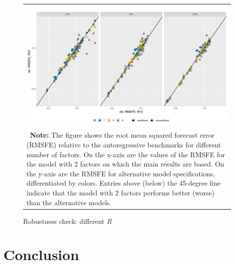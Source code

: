 \documentclass[notitlepage,a4paper,12pt]{article}
\begin{document}
\begin{figure}[htbp] \centering
    \caption{Robustness check: different $R$ \label{fig:differentR}}
    \footnotesize
    \begin{tabular}{p{16cm}}
        \multicolumn{1}{c}{\includegraphics*[scale = 0.6]{../figures/fig_eval_robustness_Nr.pdf}} \\
        {
        \footnotesize \textbf{Note:} The figure shows the root mean squared forecast error (RMSFE) relative to the autoregressive benchmarks for different number of factors. On the x-axis are the values of the RMSFE for the model with 2 factors on which the main results are based. On the y-axis are the RMSFE for alternative model specifications, differentiated by colors. Entries above (below) the 45-degree line indicate that the model with 2 factors performs better (worse) than the alternative models.  
        }
        \end{tabular}
    \newline
    \normalsize
\end{figure}

\section{Conclusion}

\newpage
\pagebreak




\pagebreak
\appendix


\end{document}
